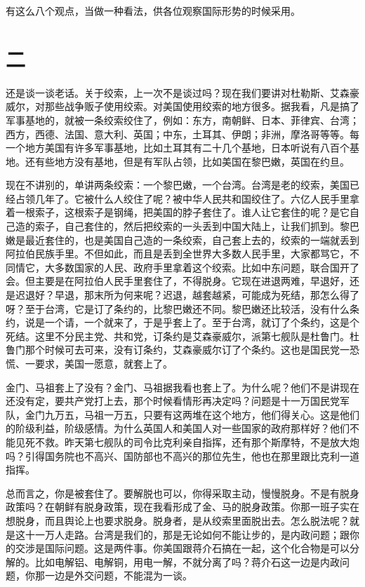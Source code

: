 有这么八个观点，当做一种看法，供各位观察国际形势的时候采用。

\section*{二}

还是谈一谈老话。关于绞索，上一次不是谈过吗？现在我们要讲对杜勒斯、艾森豪威尔，对那些战争贩子使用绞索。对美国使用绞索的地方很多。据我看，凡是搞了军事基地的，就被一条绞索绞住了，例如：东方，南朝鲜、日本、菲律宾、台湾；西方，西德、法国、意大利、英国；中东，土耳其、伊朗；非洲，摩洛哥等等。每一个地方美国有许多军事基地，比如土耳其有二十几个基地，日本听说有八百个基地。还有些地方没有基地，但是有军队占领，比如美国在黎巴嫩，英国在约旦。

现在不讲别的，单讲两条绞索：一个黎巴嫩，一个台湾。台湾是老的绞索，美国已经占领几年了。它被什么人绞住了呢？被中华人民共和国绞住了。六亿人民手里拿着一根索子，这根索子是钢绳，把美国的脖子套住了。谁人让它套住的呢？是它自己造的索子，自己套住的，然后把绞索的一头丢到中国大陆上，让我们抓到。黎巴嫩是最近套住的，也是美国自己造的一条绞索，自己套上去的，绞索的一端就丢到阿拉伯民族手里。不但如此，而且是丢到全世界大多数人民手里，大家都骂它，不同情它，大多数国家的人民、政府手里拿着这个绞索。比如中东问题，联合国开了会。但主要是在阿拉伯人民手里套住了，不得脱身。它现在进退两难，早退好，还是迟退好？早退，那末所为何来呢？迟退，越套越紧，可能成为死结，那怎么得了呀？至于台湾，它是订了条约的，比黎巴嫩还不同。黎巴嫩还比较活，没有什么条约，说是一个请，一个就来了，于是乎套上了。至于台湾，就订了个条约，这是个死结。这里不分民主党、共和党，订条约是艾森豪威尔，派第七舰队是杜鲁门。杜鲁门那个时候可去可来，没有订条约，艾森豪威尔订了个条约。这也是国民党一恐慌、一要求，美国一愿意，就套上了。

金门、马祖套上了没有？金门、马祖据我看也套上了。为什么呢？他们不是讲现在还没有定，要共产党打上去，那个时候看情形再决定吗？问题是十一万国民党军队，金门九万五，马祖一万五，只要有这两堆在这个地方，他们得关心。这是他们的阶级利益，阶级感情。为什么英国人和美国人对一些国家的政府那样好？他们不能见死不救。昨天第七舰队的司令比克利亲自指挥，还有那个斯摩特，不是放大炮吗？引得国务院也不高兴、国防部也不高兴的那位先生，他也在那里跟比克利一道指挥。

总而言之，你是被套住了。要解脱也可以，你得采取主动，慢慢脱身。不是有脱身政策吗？在朝鲜有脱身政策，现在我看形成了金、马的脱身政策。你那一班子实在想脱身，而且舆论上也要求脱身。脱身者，是从绞索里面脱出去。怎么脱法呢？就是这十一万人走路。台湾是我们的，那是无论如何不能让步的，是内政问题；跟你的交涉是国际问题。这是两件事。你美国跟蒋介石搞在一起，这个化合物是可以分解的。比如电解铝、电解铜，用电一解，不就分离了吗？蒋介石这一边是内政问题，你那一边是外交问题，不能混为一谈。


